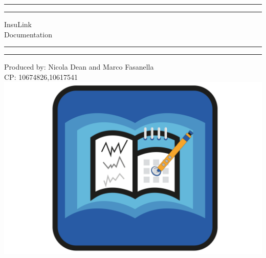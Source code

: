 \documentclass[12pt,hidelinks]{article}
\begin{document}
\begin{titlepage}
	\centering %
	\scshape %
	\vspace*{1.5\baselineskip} %

	\rule{13cm}{1.6pt}\vspace*{-\baselineskip}\vspace*{2pt} %
	\rule{13cm}{0.4pt} %
	
		\vspace{0.75\baselineskip} %
	{	\Huge InsuLink\\ 
			\vspace{4mm}
		Documentation \\	}
		\vspace{0.75\baselineskip} %
	\rule{13cm}{0.4pt}\vspace*{-\baselineskip}\vspace{3.2pt} %
	\rule{13cm}{1.6pt} %
	
		\vspace{1.75\baselineskip} %
	{\large Produced by: Nicola Dean and Marco Fasanella \\
		\vspace*{1.2\baselineskip}
	CP: 10674826,10617541} \\
	\vfill
	\includegraphics[width=\textwidth]{logo}

\end{titlepage}
\tableofcontents
\vfill
\newpage
{}
\end{document}
